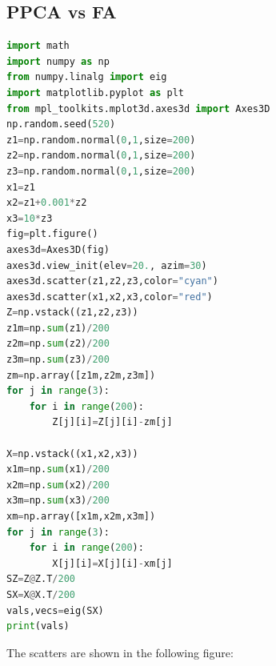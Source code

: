 \documentclass[UTF8]{ctexart}
\begin{document}
\subsection{PPCA vs FA}
\begin{lstlisting}[language=python]
import math
import numpy as np
from numpy.linalg import eig
import matplotlib.pyplot as plt
from mpl_toolkits.mplot3d.axes3d import Axes3D
np.random.seed(520)
z1=np.random.normal(0,1,size=200)
z2=np.random.normal(0,1,size=200)
z3=np.random.normal(0,1,size=200)
x1=z1
x2=z1+0.001*z2
x3=10*z3
fig=plt.figure()
axes3d=Axes3D(fig)
axes3d.view_init(elev=20., azim=30)
axes3d.scatter(z1,z2,z3,color="cyan")
axes3d.scatter(x1,x2,x3,color="red")
Z=np.vstack((z1,z2,z3))
z1m=np.sum(z1)/200
z2m=np.sum(z2)/200
z3m=np.sum(z3)/200
zm=np.array([z1m,z2m,z3m])
for j in range(3):
    for i in range(200):
        Z[j][i]=Z[j][i]-zm[j]

X=np.vstack((x1,x2,x3))
x1m=np.sum(x1)/200
x2m=np.sum(x2)/200
x3m=np.sum(x3)/200
xm=np.array([x1m,x2m,x3m])
for j in range(3):
    for i in range(200):
        X[j][i]=X[j][i]-xm[j]
SZ=Z@Z.T/200
SX=X@X.T/200
vals,vecs=eig(SX)
print(vals)
\end{lstlisting}
The scatters are shown in the following figure:
\end{document}
